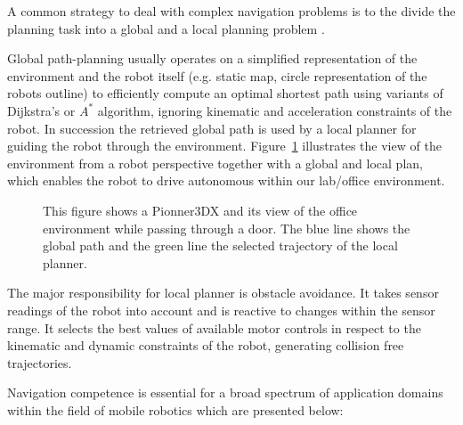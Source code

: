 A common strategy to deal with complex navigation problems is to the divide the planning task into a global and a local planning problem \cite{LaValle2006}.

Global path-planning usually operates on a simplified representation of the environment and the robot itself (e.g. static map, circle representation of the robots outline) to efficiently compute an optimal shortest path using variants of Dijkstra's \cite{dijkstra1959note} or $A^*$ \cite{DBLP:journals/tssc/HartNR68/Astar} algorithm, ignoring kinematic and acceleration constraints of the robot.
In succession the retrieved global path is used by a local planner for guiding the robot through the environment.
Figure~\ref{fig:fig_pioneer} illustrates the view of the environment from a robot perspective together with a global and local plan, which enables the robot to drive autonomous within our lab/office environment.

\begin{figure}[thpb]
      \centering
      \def\svgwidth{\textwidth}
      
      \caption[Global and local planning.]{This figure shows a Pionner3DX and its view of the office environment while passing through a door. The blue line shows the global path and the green line the selected trajectory of the local planner.}
      \label{fig:fig_pioneer}
\end{figure}

The major responsibility for local planner is obstacle avoidance. It takes sensor readings of the robot into account and is reactive to changes within the sensor range. 
It selects the best values of available motor controls in respect to the kinematic and dynamic constraints of the robot, generating collision free trajectories. 
   
Navigation competence is essential for a broad spectrum of application domains within the field of mobile robotics which are presented below:

